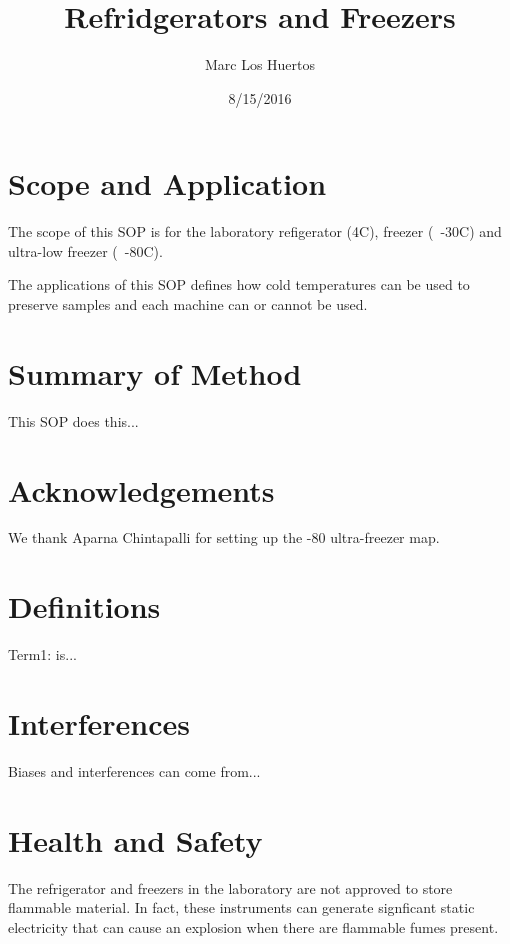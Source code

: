 \documentclass[12pt]{../SOP3_alpha}
\title{Refridgerators and Freezers}
\date{8/15/2016}
\author{Marc Los Huertos}
\begin{document}


\maketitle

\section{Scope and Application}

\NP The scope of this SOP is for the laboratory refigerator (4\degree C), freezer (~-30\degree C) and ultra-low freezer (~-80\degree C).

\NP The applications of this SOP defines how cold temperatures can be used to preserve samples and each machine can or cannot be used.

\section{Summary of Method}

\NP This SOP does this...

\tableofcontents

\newpage

\section{Acknowledgements}

We thank Aparna Chintapalli for setting up the -80 ultra-freezer map.

\section{Definitions}

\NP Term1: is...

\section{Interferences}

\NP Biases and interferences can come from...

\section{Health and Safety}

\NP The refrigerator and freezers in the laboratory are not approved to store flammable material. In fact, these instruments can generate signficant static electricity that can cause an explosion when there are flammable fumes present. 
\end{document}
